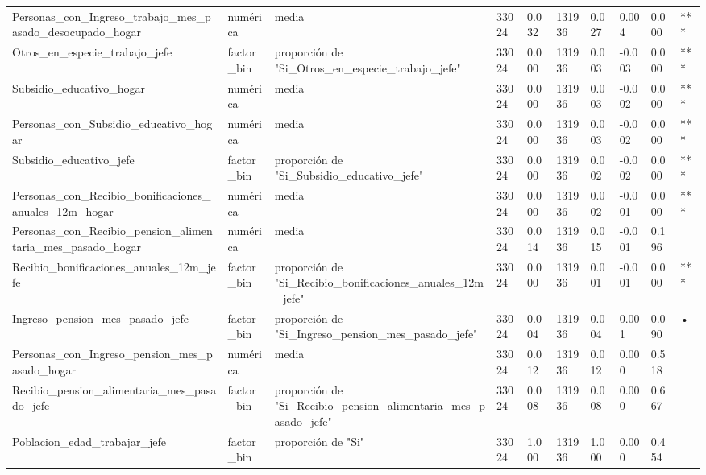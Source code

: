 \begin{longtable}[t]{llllllllll}
Personas\_con\_Ingreso\_trabajo\_mes\_pasado\_desocupado\_hogar & numérica & media & 33024 & 0.032 & 131936 & 0.027 & 0.004 & 0.000 & ***\\
Otros\_en\_especie\_trabajo\_jefe & factor\_bin & proporción de "Si\_Otros\_en\_especie\_trabajo\_jefe" & 33024 & 0.000 & 131936 & 0.003 & -0.003 & 0.000 & ***\\
Subsidio\_educativo\_hogar & numérica & media & 33024 & 0.000 & 131936 & 0.003 & -0.002 & 0.000 & ***\\
Personas\_con\_Subsidio\_educativo\_hogar & numérica & media & 33024 & 0.000 & 131936 & 0.003 & -0.002 & 0.000 & ***\\
Subsidio\_educativo\_jefe & factor\_bin & proporción de "Si\_Subsidio\_educativo\_jefe" & 33024 & 0.000 & 131936 & 0.002 & -0.002 & 0.000 & ***\\
Personas\_con\_Recibio\_bonificaciones\_anuales\_12m\_hogar & numérica & media & 33024 & 0.000 & 131936 & 0.002 & -0.001 & 0.000 & ***\\
Personas\_con\_Recibio\_pension\_alimentaria\_mes\_pasado\_hogar & numérica & media & 33024 & 0.014 & 131936 & 0.015 & -0.001 & 0.196 & \\
Recibio\_bonificaciones\_anuales\_12m\_jefe & factor\_bin & proporción de "Si\_Recibio\_bonificaciones\_anuales\_12m\_jefe" & 33024 & 0.000 & 131936 & 0.001 & -0.001 & 0.000 & ***\\
Ingreso\_pension\_mes\_pasado\_jefe & factor\_bin & proporción de "Si\_Ingreso\_pension\_mes\_pasado\_jefe" & 33024 & 0.004 & 131936 & 0.004 & 0.001 & 0.090 & •\\
Personas\_con\_Ingreso\_pension\_mes\_pasado\_hogar & numérica & media & 33024 & 0.012 & 131936 & 0.012 & 0.000 & 0.518 & \\
Recibio\_pension\_alimentaria\_mes\_pasado\_jefe & factor\_bin & proporción de "Si\_Recibio\_pension\_alimentaria\_mes\_pasado\_jefe" & 33024 & 0.008 & 131936 & 0.008 & 0.000 & 0.667 & \\
Poblacion\_edad\_trabajar\_jefe & factor\_bin & proporción de "Si" & 33024 & 1.000 & 131936 & 1.000 & 0.000 & 0.454 & \\*
\end{longtable}